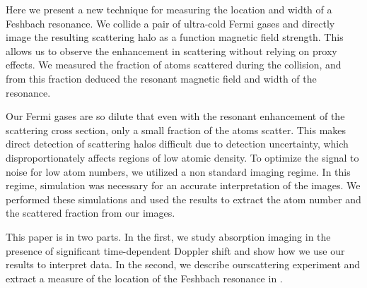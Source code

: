 \documentclass[12pt]{iopart}
\begin{document}
\par Here we present a new technique for measuring the location and width of a Feshbach resonance. We collide a pair of ultra-cold Fermi gases and directly image the resulting \swave scattering halo as a function magnetic field strength. This allows us to observe the enhancement in scattering without relying on proxy effects. We measured the fraction of atoms scattered during the collision, and from this fraction deduced the resonant magnetic field  and width of the resonance.
\par Our Fermi gases are so dilute that even with the resonant enhancement of the scattering cross section, only a small fraction of the atoms scatter. This makes direct detection of \swave scattering halos difficult due to detection uncertainty, which disproportionately affects regions of low atomic density. To optimize the signal to noise for low atom numbers, we utilized a non standard imaging regime. In this regime, simulation was necessary for an accurate interpretation of the images. We performed these simulations and used the results to extract the atom number and the scattered fraction from our images.
\par This paper is in two parts. In the first, we study absorption imaging in the presence of significant time-dependent Doppler shift and show how we use our results to interpret data. In the second, we describe our\swave scattering experiment and extract a measure of the location of the Feshbach resonance in \K{}. 
\end{document}

